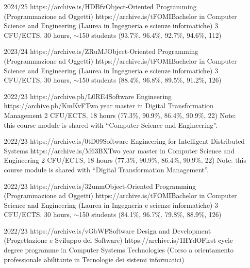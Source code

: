\begin{outerlist}
    \item[2024/25]
        \unibocourse
        {https://archive.is/HDBfv}{Object-Oriented Programming (Programmazione ad Oggetti)}
        {https://archive.is/tFOMI}{Bachelor in Computer Science and Engineering (Laurea in Ingegneria e scienze informatiche)}
        {3 CFU/ECTS, 30 hours, $\sim$150 students}
        {(93.7\%, 96.4\%, 92.7\%, 94.6\%, 112)}
        {\oopjava}
    \item[2023/24]
        \unibocourse
        {https://archive.is/ZRuMJ}{Object-Oriented Programming (Programmazione ad Oggetti)}
        {https://archive.is/tFOMI}{Bachelor in Computer Science and Engineering (Laurea in Ingegneria e scienze informatiche)}
        {3 CFU/ECTS, 30 hours, $\sim$150 students}
        {(88.4\%, 96.8\%, 89.5\%, 91.2\%, 126)}
        {\oopjava}
    \item[2022/23]
        \unibocourse %
        {https://archive.ph/L0RE4}{Software Engineering}
        {https://archive.ph/KmKvF}{Two year master in Digital Transformation Management}
        {2 CFU/ECTS, 18 hours}
        {(77.3\%, 90.9\%, 86.4\%, 90.9\%, 22)}
        {
            \sedtmeit{}
            Note: this course module is shared with ``Computer Science and Engineering''.
        }
    \item[2022/23]
        \unibocourse %
        {https://archive.is/0tD09}{Software Engineering for Intelligent Distributed Systems}
        {https://archive.is/M63BX}{Two year master in Computer Science and Engineering}
        {2 CFU/ECTS, 18 hours}
        {(77.3\%, 90.9\%, 86.4\%, 90.9\%, 22)}
        {
            \sedtmeit{}
            Note: this course module is shared with ``Digital Transformation Management''.
        }
    \item[2022/23]
        \unibocourse
        {https://archive.is/32unm}{Object-Oriented Programming (Programmazione ad Oggetti)}
        {https://archive.is/tFOMI}{Bachelor in Computer Science and Engineering (Laurea in Ingegneria e scienze informatiche)}
        {3 CFU/ECTS, 30 hours, $\sim$150 students}
        {(84.1\%, 96.7\%, 79.8\%, 88.9\%, 126)}
        {\oopjava}
    \item[2022/23]
        \unibocourse
        {https://archive.is/vGbWF}{Software Design and Development (Progettazione e Sviluppo del Software)}
        {https://archive.is/1HYdO}{First cycle degree programme in Computer Systems Technologies (Corso a orientamento professionale abilitante in Tecnologie dei sistemi informatici)}

\end{outerlist}
